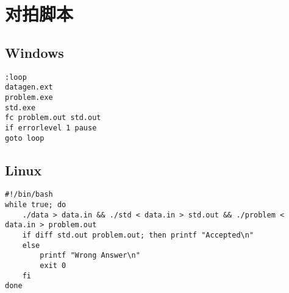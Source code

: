 \section*{对拍脚本}
\subsection*{Windows}
\begin{verbatim}
:loop
datagen.ext
problem.exe
std.exe
fc problem.out std.out
if errorlevel 1 pause
goto loop
\end{verbatim}

\subsection*{Linux}
\begin{verbatim}
#!/bin/bash
while true; do
    ./data > data.in && ./std < data.in > std.out && ./problem < data.in > problem.out
    if diff std.out problem.out; then printf "Accepted\n"
    else
        printf "Wrong Answer\n"
        exit 0
    fi
done
\end{verbatim}